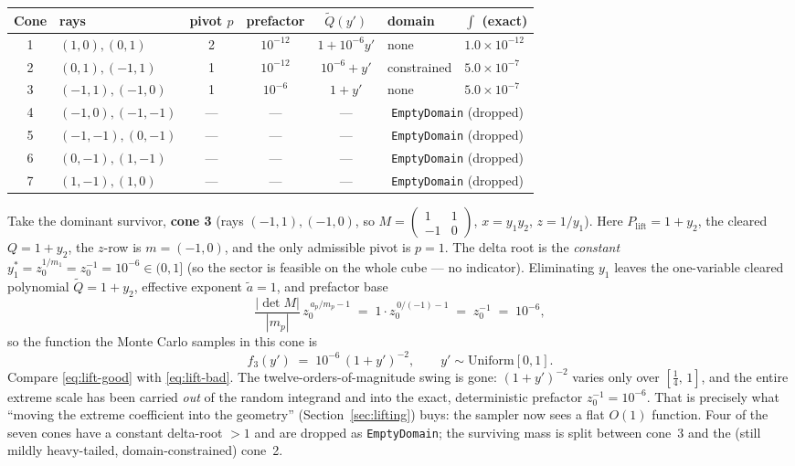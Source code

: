 \documentclass[11pt,a4paper]{article}
\begin{document}
\begin{center}
\begin{tabular}{clcccll}
\toprule
Cone & rays & pivot $p$ & prefactor & $\tilde Q(y')$ & domain & $\int$ (exact) \\
\midrule
1 & $(1,0),(0,1)$   & 2 & $10^{-12}$ & $1 + 10^{-6}y'$ & none        & $1.0\times10^{-12}$ \\
2 & $(0,1),(-1,1)$  & 1 & $10^{-12}$ & $10^{-6} + y'$  & constrained & $5.0\times10^{-7}$ \\
3 & $(-1,1),(-1,0)$ & 1 & $10^{-6}$  & $1 + y'$        & none        & $5.0\times10^{-7}$ \\
4 & $(-1,0),(-1,-1)$ & --- & --- & --- & \multicolumn{2}{c}{\texttt{EmptyDomain} (dropped)} \\
5 & $(-1,-1),(0,-1)$ & --- & --- & --- & \multicolumn{2}{c}{\texttt{EmptyDomain} (dropped)} \\
6 & $(0,-1),(1,-1)$  & --- & --- & --- & \multicolumn{2}{c}{\texttt{EmptyDomain} (dropped)} \\
7 & $(1,-1),(1,0)$   & --- & --- & --- & \multicolumn{2}{c}{\texttt{EmptyDomain} (dropped)} \\
\bottomrule
\end{tabular}
\end{center}

Take the dominant survivor, \textbf{cone 3} (rays $(-1,1),(-1,0)$, so
$M=\left(\begin{smallmatrix}1&1\\-1&0\end{smallmatrix}\right)$, $x=y_1 y_2$,
$z=1/y_1$). Here $P_{\mathrm{lift}} = 1 + y_2$, the cleared $Q = 1+y_2$, the
$z$-row is $m=(-1,0)$, and the only admissible pivot is $p=1$. The delta root
is the \emph{constant} $y_1^* = z_0^{1/m_1} = z_0^{-1} = 10^{-6}\in(0,1]$ (so
the sector is feasible on the whole cube --- no indicator). Eliminating $y_1$
leaves the one-variable cleared polynomial $\tilde Q = 1 + y_2$, effective
exponent $\tilde a = 1$, and prefactor base
\begin{equation}
\frac{|\det M|}{|m_p|}\,z_0^{\,a_p/m_p-1}
\;=\; 1\cdot z_0^{\,0/(-1)-1} \;=\; z_0^{-1} \;=\; 10^{-6},
\end{equation}
so the function the Monte Carlo samples in this cone is
\begin{equation}\label{eq:lift-good}
f_3(y') \;=\; 10^{-6}\,(1 + y')^{-2}, \qquad y'\sim\mathrm{Uniform}[0,1].
\end{equation}
Compare \eqref{eq:lift-good} with \eqref{eq:lift-bad}. The twelve-orders-of-magnitude
swing is gone: $(1+y')^{-2}$ varies only over $[\tfrac14,\,1]$, and the entire
extreme scale has been carried \emph{out} of the random integrand and into the
exact, deterministic prefactor $z_0^{-1}=10^{-6}$. That is precisely what
``moving the extreme coefficient into the geometry'' (Section~\ref{sec:lifting})
buys: the sampler now sees a flat $O(1)$ function. Four of the seven cones have
a constant delta-root $>1$ and are dropped as \texttt{EmptyDomain}; the
surviving mass is split between cone~3 and the (still mildly heavy-tailed,
domain-constrained) cone~2.
\end{document}
